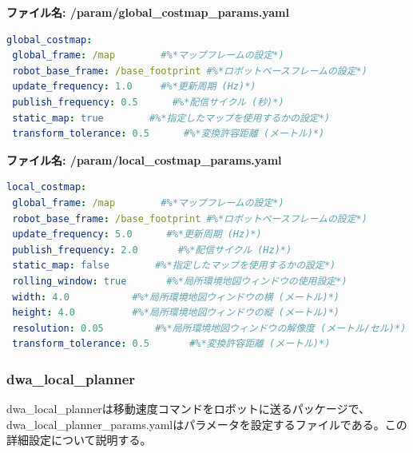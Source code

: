 \textbf{ファイル名: /param/global\_costmap\_params.yaml}
\begin{lstlisting}[language=YAML]
global_costmap:
 global_frame: /map        #%*マップフレームの設定*)
 robot_base_frame: /base_footprint #%*ロボットベースフレームの設定*)
 update_frequency: 1.0     #%*更新周期 (Hz)*)
 publish_frequency: 0.5      #%*配信サイクル (秒)*)
 static_map: true        #%*指定したマップを使用するかの設定*)
 transform_tolerance: 0.5      #%*変換許容距離 (メートル)*)
\end{lstlisting}

\textbf{ファイル名: /param/local\_costmap\_params.yaml}
\begin{lstlisting}[language=YAML]
local_costmap:
 global_frame: /map        #%*マップフレームの設定*)
 robot_base_frame: /base_footprint #%*ロボットベースフレームの設定*)
 update_frequency: 5.0      #%*更新周期 (Hz)*)
 publish_frequency: 2.0       #%*配信サイクル (Hz)*)
 static_map: false        #%*指定したマップを使用するかの設定*)
 rolling_window: true       #%*局所環境地図ウィンドウの使用設定*)
 width: 4.0           #%*局所環境地図ウィンドウの横 (メートル)*)
 height: 4.0          #%*局所環境地図ウィンドウの縦 (メートル)*)
 resolution: 0.05         #%*局所環境地図ウィンドウの解像度 (メートル/セル)*)
 transform_tolerance: 0.5       #%*変換許容距離 (メートル)*)
\end{lstlisting}

\subsubsection{dwa\_local\_planner}

dwa\_local\_plannerは移動速度コマンドをロボットに送るパッケージで、dwa\_local\_planner\_params.yamlはパラメータを設定するファイルである。この詳細設定について説明する。

